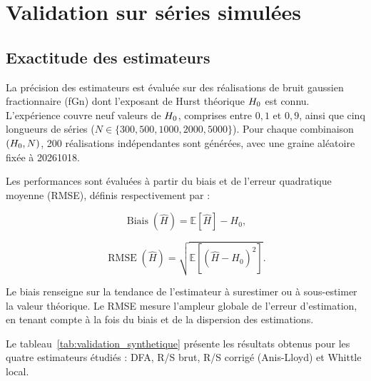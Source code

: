 \section{Validation sur séries simulées}
\label{sec:validation}

\subsection{Exactitude des estimateurs}

La précision des estimateurs est évaluée sur des réalisations de bruit
gaussien fractionnaire (fGn) dont l'exposant de Hurst théorique
$H_0$ est connu. L'expérience couvre neuf valeurs de
$H_0$, comprises entre $0{,}1$ et $0{,}9$, ainsi que cinq
longueurs de séries ($N \in \{300,500,1000,2000,5000\}$).
Pour chaque combinaison $(H_0,N)$, 200 réalisations
indépendantes sont générées, avec une graine aléatoire fixée à
20261018.

Les performances sont évaluées à partir du biais et de l'erreur
quadratique moyenne (RMSE), définis respectivement par :

\begin{equation}
\operatorname{Biais}(\widehat H)
=
\mathbb{E}[\widehat H]-H_0,
\end{equation}

\begin{equation}
\operatorname{RMSE}(\widehat H)
=
\sqrt{
\mathbb{E}\left[
(\widehat H-H_0)^2
\right]
}.
\end{equation}

Le biais renseigne sur la tendance de l'estimateur à surestimer ou
à sous-estimer la valeur théorique. Le RMSE mesure l'ampleur globale
de l'erreur d'estimation, en tenant compte à la fois du biais et
de la dispersion des estimations.

Le tableau~\ref{tab:validation_synthetique} présente les résultats
obtenus pour les quatre estimateurs étudiés : DFA, R/S brut,
R/S corrigé (Anis-Lloyd) et Whittle local.

